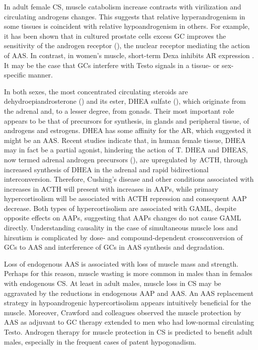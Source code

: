 \documentclass[12pt,english]{report}\usepackage[]{graphicx}\usepackage[]{color}
\begin{document}
In adult female CS, muscle catabolism increase contrasts with virilization
and circulating androgens changes. This suggests that relative hyperandrogenism
in some tissues is coincident with relative hypoandrogenism in others.
For example, it has been shown that in cultured prostate cells excess
GC improves the sensitivity of the androgen receptor ()\citep{arora2013glucocorticoid},
the nuclear receptor mediating the action of AAS. In contrast, in
women’s muscle, short-term Dexa inhibits AR expression \citep{inder2010dexamethasone}.
It may be the case that GCs interfere with Testo signals in a tissue-
or sex-specific manner.

In both sexes, the most concentrated circulating steroids are dehydroepiandrosterone
() and its ester, DHEA
sulfate (), which
originate from the adrenal and, to a lesser degree, from gonads. Their
most important role appears to be that of precursors for synthesis,
in glands and peripheral tissue, of androgens and estrogens. DHEA
has some affinity for the AR, which suggested it might be an AAS.
Recent studies indicate that, in human female tissue, DHEA may in
fact be a partial agonist, hindering the action of T\citep{chen2005direct}.
DHEA and DHEAS, now termed adrenal androgen precursors (),
are upregulated by ACTH, through increased synthesis of DHEA in the
adrenal and rapid bidirectional interconversion\citep{jones1970steroid,vaitukaitis1969role}.
Therefore, Cushing's disease and other conditions associated with
increases in ACTH will present with increases in AAPs, while primary
hypercortisolism will be associated with ACTH repression and consequent
AAP decrease\citep{kouyama2011clinicopathological,monteleone2006impaired,barbetta2001androgen,yamaji1984serum}.
Both types of hypercortisolism are associated with GAML, despite opposite
effects on AAPs, suggesting that AAPs changes do not cause GAML directly.
Understanding causality in the case of simultaneous muscle loss and
hirsutism is complicated by dose- and compound-dependent crossconversion
of GCs to AAS and interference of GCs in AAS synthesis and degradation.

Loss of endogenous AAS is associated with loss of muscle mass and
strength\citep{volpato2014prevalence,ramos1998muscle}. Perhaps for
this reason, muscle wasting is more common in males than in females
with endogenous CS\citep{pecorigiraldi2003gender-related}. At least
in adult males, muscle loss in CS may be aggravated by the reductions
in endogenous AAP and AAS. An AAS replacement strategy in hypoandrogenic
hypercortisolism appears intuitively beneficial for the muscle. Moreover,
Crawford and colleagues observed the muscle protection by AAS as adjuvant
to GC therapy extended to men who had low-normal circulating Testo\citep{crawford2003randomized}.
Androgen therapy for muscle protection in CS is predicted to benefit
adult males, especially in the frequent cases of patent hypogonadism.
\end{document}
